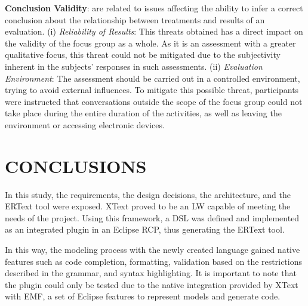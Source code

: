 \documentclass[a4paper,twoside,anonymous]{article}
\begin{document}
\textbf{Conclusion Validity}: are related to issues affecting the ability to infer a correct conclusion about the relationship between treatments and results of an evaluation.
(i) \textit{Reliability of Results}: This threats obtained has a direct impact on the validity of the focus group as a whole. As it is an assessment with a greater qualitative focus, this threat could not be mitigated due to the subjectivity inherent in the subjects' responses in such assessments.
(ii) \textit{Evaluation Environment}: The assessment should be carried out in a controlled environment, trying to avoid external influences. 
To mitigate this possible threat, participants were instructed that conversations outside the scope of the focus group could not take place during the entire duration of the activities, as well as leaving the environment or accessing electronic devices. 

\section{\uppercase{Conclusions}}
\label{sec:conclusion}

In this study, the requirements, the design decisions, the architecture, and the ERText tool were exposed.
XText proved to be an LW capable of meeting the needs of the project.
Using this framework, a DSL was defined and implemented as an integrated plugin in an Eclipse RCP, thus generating the ERText tool.

In this way, the modeling process with the newly created language gained native features such as code completion, formatting, validation based on the restrictions described in the grammar, and syntax highlighting.
It is important to note that the plugin could only be tested due to the native integration provided by XText with EMF, a set of Eclipse features to represent models and generate code. %
\end{document}
